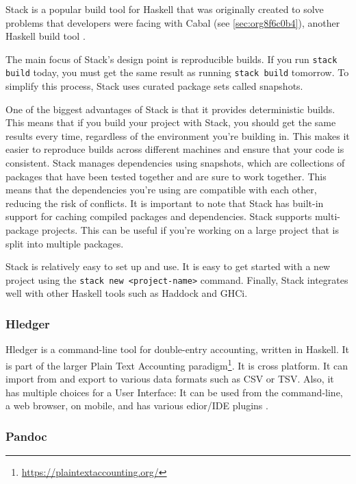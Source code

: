 \documentclass[a4paper, titlepage, twoside]{article}
\begin{document}
Stack is a popular build tool for Haskell that was originally created to solve problems that developers were facing with Cabal (see \ref{sec:org8f6c0b4}), another Haskell build tool \autocite{CommercialhaskellStack2023}.

The main focus of Stack's design point is reproducible builds. If you run \texttt{stack build} today, you must get the same result as running \texttt{stack build} tomorrow. To simplify this process, Stack uses curated package sets called snapshots.

One of the biggest advantages of Stack is that it provides deterministic builds. This means that if you build your project with Stack, you should get the same results every time, regardless of the environment you're building in. This makes it easier to reproduce builds across different machines and ensure that your code is consistent. Stack manages dependencies using snapshots, which are collections of packages that have been tested together and are sure to work together. This means that the dependencies you're using are compatible with each other, reducing the risk of conflicts. It is important to note that Stack has built-in support for caching compiled packages and dependencies. Stack supports multi-package projects. This can be useful if you're working on a large project that is split into multiple packages.

Stack is relatively easy to set up and use. It is easy to get started with a new project using the \texttt{stack new <project-name>} command. Finally, Stack integrates well with other Haskell tools such as Haddock and GHCi.

\subsubsection{Hledger}
\label{sec:org9196b15}

Hledger is a command-line tool for double-entry accounting, written in Haskell. It is part of the larger Plain Text Accounting paradigm\footnote{\url{https://plaintextaccounting.org/}}. It is cross platform. It can import from and export to various data formats such as CSV or TSV. Also, it has multiple choices for a User Interface: It can be used from the command-line, a web browser, on mobile, and has various edior/IDE plugins \autocite{michaelHledger2023}.

\subsubsection{Pandoc}
\label{sec:org639fa19}
\end{document}
